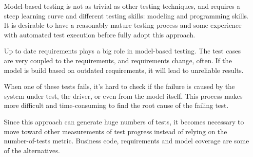 Model-based testing is not as trivial as other testing techniques, and requires a steep learning curve and different testing skills: modeling and programming skills. It is desirable to have a reasonably mature testing process and some experience with automated test execution before fully adopt this approach.

Up to date requirements plays a big role in model-based testing. The test cases are very coupled to the requirements, and requirements change, often. If the model is build based on outdated requirements, it will lead to unreliable results.

When one of these tests fails, it's hard to check if the failure is caused by the system under test, the driver, or even from the model itself. This process makes more difficult and time-consuming to find the root cause of the failing test.

Since this approach can generate huge numbers of tests, it becomes necessary to move toward other measurements of test progress instead of relying on the number-of-tests metric. Business code, requirements and model coverage are some of the alternatives.

